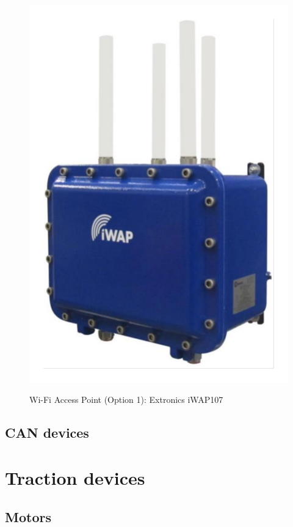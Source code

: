 \begin{figure}
  \centering
  \includegraphics[angle=90,width=1\columnwidth]{figs/body02/FIGDEVICEWIFIOPTION1.pdf}\\
  \caption[Wi-Fi Access Point (Option 1): Extronics iWAP107]{Wi-Fi Access Point (Option 1): Extronics iWAP107}
  \label{FIG:DEVICEWIFIOPTION1}
\end{figure}
\subsection{CAN devices} \label{DEVICE:CAN}
\section{Traction devices}
\subsection{Motors}
